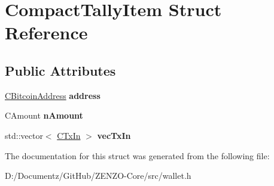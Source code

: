 \hypertarget{struct_compact_tally_item}{}\section{Compact\+Tally\+Item Struct Reference}
\label{struct_compact_tally_item}
\subsection*{Public Attributes}
\begin{DoxyCompactItemize}
\item 
\mbox{\label{struct_compact_tally_item_a5ede18db63876797ed696a53e4ed840f}} 
\mbox{\hyperlink{class_c_bitcoin_address}{C\+Bitcoin\+Address}} {\bfseries address}
\item 
\mbox{\label{struct_compact_tally_item_a0efb39fdaacf62d56f5cb90261b71402}} 
C\+Amount {\bfseries n\+Amount}
\item 
\mbox{\label{struct_compact_tally_item_aaa4af089e3d784811ebadd4eb89eb54b}} 
std\+::vector$<$ \mbox{\hyperlink{class_c_tx_in}{C\+Tx\+In}} $>$ {\bfseries vec\+Tx\+In}
\end{DoxyCompactItemize}


The documentation for this struct was generated from the following file\+:\begin{DoxyCompactItemize}
\item 
D\+:/\+Documentz/\+Git\+Hub/\+Z\+E\+N\+Z\+O-\/\+Core/src/wallet.\+h\end{DoxyCompactItemize}
